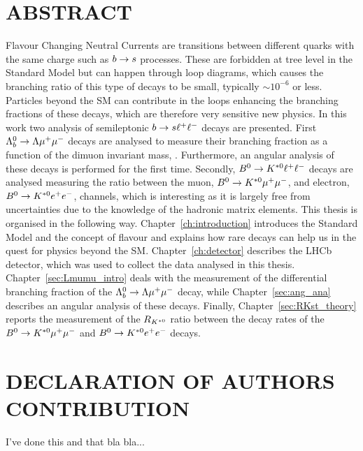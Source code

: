 \chapter*{ABSTRACT}
%
Flavour Changing Neutral Currents are transitions between different quarks with the same charge such as $b\rightarrow s$ processes. These are forbidden at tree level in the Standard Model but
can happen through loop diagrams, which causes the branching ratio of this type of decays
to be small, typically $\sim 10^{-6}$ or less. Particles beyond the SM can contribute in the loops enhancing
the branching fractions of these decays, which are therefore very sensitive new physics.
In this work two analysis of semileptonic $b\rightarrow s\ell^+ \ell^-$ decays are presented.
First $\Lambda^0_b\rightarrow\Lambda\mu^+\mu^-$ decays are analysed to measure their branching fraction as a function
of the dimuon invariant mass, \qsq. Furthermore, an angular analysis of these decays is performed for the first time. 
Secondly, $B^0\rightarrow K^{*0}\ell^+ \ell^-$ decays are analysed measuring the ratio between the muon, $B^0\rightarrow K^{*0}\mu^+\mu^-$, 
and electron, $B^0\rightarrow K^{*0}e^+ e^-$, channels, which is interesting as it is largely free
from uncertainties due to the knowledge of the hadronic matrix elements.
This thesis is organised in the following way. Chapter~\ref{ch:introduction} introduces the Standard Model and 
the concept of flavour and explains how rare decays can help us in the quest for physics beyond the SM.
Chapter~\ref{ch:detector} describes the LHCb detector, which was used to collect the data analysed in this thesis.
Chapter~\ref{sec:Lmumu_intro} deals with the measurement of the differential branching fraction of the $\Lambda^0_b\rightarrow\Lambda\mu^+\mu^-$ 
decay, while Chapter~\ref{sec:ang_ana} describes an angular analysis of these decays.
Finally, Chapter~\ref{sec:RKst_theory} reports the measurement of the $R_{K^{*0}}$ ratio between the decay rates
of the $B^0\rightarrow K^{*0}\mu^+\mu^-$ and $B^0\rightarrow K^{*0}e^+ e^-$ decays.
%
\clearpage

\chapter*{DECLARATION OF AUTHORS CONTRIBUTION}
%
I've done this and that bla bla...

